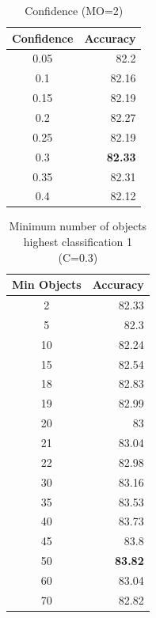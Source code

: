 \documentclass[12pt]{article}
\begin{document}
\begin{table}[htbp]
  \centering
  \caption{Confidence (MO=2)}
    \begin{tabular}{c|r}
    \toprule
    \multicolumn{1}{l|}{Confidence} & \multicolumn{1}{l}{Accuracy} \\
    \midrule
    0.05  & 82.2 \\
    0.1   & 82.16 \\
    0.15  & 82.19 \\
    0.2   & 82.27 \\
    0.25  & 82.19 \\
    0.3   & \textbf{82.33} \\
    0.35  & 82.31 \\
    0.4   & 82.12 \\
    \bottomrule
    \end{tabular}%
  \label{tab:addlabel}%
\end{table}%


\begin{table}[htbp]
  \centering
  \caption{Minimum number of objects highest classification 1 (C=0.3)}
    \begin{tabular}{c|r}
    \toprule
    \multicolumn{1}{l|}{Min Objects} & \multicolumn{1}{l}{Accuracy} \\
    \midrule
    2     & 82.33 \\
    5     & 82.3 \\
    10    & 82.24 \\
    15    & 82.54 \\
    18    & 82.83 \\
    19    & 82.99 \\
    20    & 83 \\
    21    & 83.04 \\
    22    & 82.98 \\
    30    & 83.16 \\
    35    & 83.53 \\
    40    & 83.73 \\
    45    & 83.8 \\
    50    & \textbf{83.82} \\
    60    & 83.04 \\
    70    & 82.82 \\
    \bottomrule
    \end{tabular}%
  \label{tab:addlabel}%
\end{table}%
\end{document}
